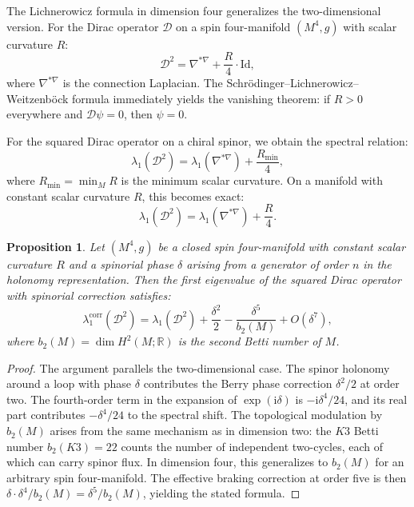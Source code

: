 \documentclass[12pt,a4paper]{article}
\newtheorem{proposition}[theorem]{Proposition}
\theoremstyle{definition}
\theoremstyle{remark}
\newcommand{\RR}{\mathbb{R}}
\newcommand{\cD}{\mathcal{D}}
\newcommand{\ii}{\mathrm{i}}
\begin{document}
The Lichnerowicz formula in dimension four generalizes the two-dimensional version. For the Dirac operator $\cD$ on a spin four-manifold $(M^4, g)$ with scalar curvature $R$:
\begin{equation}
\cD^2 = \nabla^{*\nabla} + \frac{R}{4} \cdot \mathrm{Id},
\end{equation}
where $\nabla^{*\nabla}$ is the connection Laplacian. The Schr\"odinger--Lichnerowicz--Weitzenb\"ock formula immediately yields the vanishing theorem: if $R > 0$ everywhere and $\cD\psi = 0$, then $\psi = 0$.

For the squared Dirac operator on a chiral spinor, we obtain the spectral relation:
\begin{equation}
\lambda_1(\cD^2) = \lambda_1(\nabla^{*\nabla}) + \frac{R_{\min}}{4},
\end{equation}
where $R_{\min} = \min_M R$ is the minimum scalar curvature. On a manifold with constant scalar curvature $R$, this becomes exact:
\begin{equation}
\lambda_1(\cD^2) = \lambda_1(\nabla^{*\nabla}) + \frac{R}{4}.
\end{equation}

\begin{proposition}
\label{prop:4d-spectrum}
Let $(M^4, g)$ be a closed spin four-manifold with constant scalar curvature $R$ and a spinorial phase $\delta$ arising from a generator of order $n$ in the holonomy representation. Then the first eigenvalue of the squared Dirac operator with spinorial correction satisfies:
\begin{equation}
\lambda_1^{\mathrm{corr}}(\cD^2) = \lambda_1(\cD^2) + \frac{\delta^2}{2} - \frac{\delta^5}{b_2(M)} + O(\delta^7),
\end{equation}
where $b_2(M) = \dim H^2(M; \RR)$ is the second Betti number of $M$.
\end{proposition}

\begin{proof}
The argument parallels the two-dimensional case. The spinor holonomy around a loop with phase $\delta$ contributes the Berry phase correction $\delta^2/2$ at order two. The fourth-order term in the expansion of $\exp(\ii\delta)$ is $-\ii\delta^4/24$, and its real part contributes $-\delta^4/24$ to the spectral shift. The topological modulation by $b_2(M)$ arises from the same mechanism as in dimension two: the $K3$ Betti number $b_2(K3) = 22$ counts the number of independent two-cycles, each of which can carry spinor flux. In dimension four, this generalizes to $b_2(M)$ for an arbitrary spin four-manifold. The effective braking correction at order five is then $\delta \cdot \delta^4/b_2(M) = \delta^5/b_2(M)$, yielding the stated formula.
\end{proof}
\end{document}
